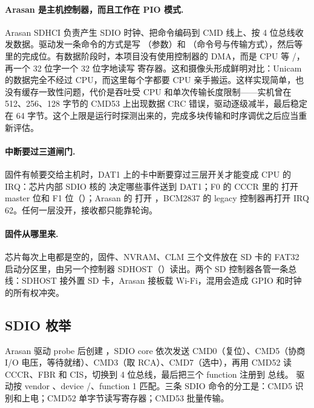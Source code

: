 \paragraph{Arasan 是主机控制器，而且工作在 PIO 模式.} Arasan SDHCI 负责产生 SDIO 时钟、把命令编码到 CMD 线上、按 4 位总线收发数据。驱动发一条命令的方式是写 （参数）和 （命令号与传输方式），然后等  里的完成位。有数据阶段时，本项目没有使用控制器的 DMA，而是 CPU 等 /，再一个 32 位字一个 32 位字地读写  寄存器。这和摄像头形成鲜明对比：Unicam 的数据完全不经过 CPU，而这里每个字都要 CPU 亲手搬运。这样实现简单，也没有缓存一致性问题，代价是吞吐受 CPU 和单次传输长度限制——实机曾在 512、256、128 字节的 CMD53 上出现数据 CRC 错误，驱动逐级减半，最后稳定在 64 字节。这个上限是运行时探测出来的，完成多块传输和时序调优之后应当重新评估。

\paragraph{中断要过三道闸门.} 固件有帧要交给主机时，DAT1 上的卡中断要穿过三层开关才能变成 CPU 的 IRQ：芯片内部 SDIO 核的  决定哪些事件送到 DAT1；F0 的 CCCR 里的  打开 master 位和 F1 位（）；Arasan 的  打开 ，BCM2837 的 legacy 控制器再打开 IRQ 62。任何一层没开，接收都只能靠轮询。

\paragraph{固件从哪里来.} 芯片每次上电都是空的，固件、NVRAM、CLM 三个文件放在 SD 卡的 FAT32 启动分区里，由另一个控制器 SDHOST（）读出。两个 SD 控制器各管一条总线：SDHOST 接外置 SD 卡，Arasan 接板载 Wi-Fi，混用会造成 GPIO 和时钟的所有权冲突。


\subsection{SDIO 枚举}

Arasan 驱动 probe 后创建 ，SDIO core 依次发送 CMD0（复位）、CMD5（协商 I/O 电压，等待就绪）、CMD3（取 RCA）、CMD7（选中），再用 CMD52 读 CCCR、FBR 和 CIS，切换到 4 位总线，最后把三个 function 注册到  总线。 驱动按 vendor 、device /、function 1 匹配。三条 SDIO 命令的分工是：CMD5 识别和上电；CMD52 单字节读写寄存器；CMD53 批量传输。

